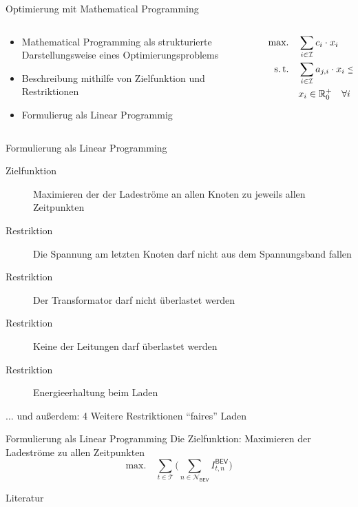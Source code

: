 \documentclass[aspectratio=169]{beamer}
\begin{document}
\begin{frame}{Optimierung mit Mathematical Programming}
	\begin{columns}
		\begin{column}{.6\textwidth}
			\begin{itemize}
				\item Mathematical Programming als strukturierte 
				Darstellungsweise eines Optimierungsproblems
				\item Beschreibung mithilfe von Zielfunktion und Restriktionen
				\item Formulierug als Linear Programmig
			\end{itemize}
		\end{column}
		\begin{column}{.4\textwidth}
			\begin{align*}
				\begin{split}
		\text{max.}\quad&\sum_{i\in\mathcal{I}}c_i\cdot x_i \\
		\text{s.\,t.}\quad&\sum_{i\in\mathcal{I}}a_{j,i}\cdot x_i\leq b_j\quad
		\forall j\in\mathcal{J} \\
		& x_i\in\mathbb{R}_0^+\quad\forall i\in\mathcal{I}
				\end{split}
			\end{align*}
		\end{column}
	\end{columns}
\end{frame}


\begin{frame}{Formulierung als Linear Programming}
	\begin{description}
		\item[Zielfunktion] Maximieren der der Ladeströme an allen Knoten zu 
		jeweils allen Zeitpunkten
		\item[Restriktion] Die Spannung am letzten Knoten darf nicht aus dem
		Spannungsband fallen
		\item[Restriktion] Der Transformator darf nicht überlastet werden
		\item[Restriktion] Keine der Leitungen darf überlastet werden
		\item[Restriktion] Energieerhaltung beim Laden
	\end{description}
	\begin{block}{$\dots$ und außerdem:}
		4 Weitere Restriktionen \enquote{faires} Laden
	\end{block}
\end{frame}


\begin{frame}{Formulierung als Linear Programming}
	Die Zielfunktion: Maximieren der Ladeströme zu allen Zeitpunkten
	\begin{equation*}
		\text{max.}\quad\sum_{t\in\mathcal{T}}\bigg(\sum_{n\in
		\mathcal{N_\mathsf{BEV}}}\!\!I^\mathsf{BEV}_{t,n}\bigg)
	\end{equation*}
\end{frame}


\begin{frame}{Literatur}
	\printbibliography
\end{frame}
\end{document}
